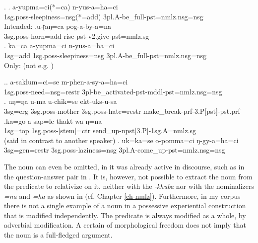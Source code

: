 \ex. \ag. a-yupma=ci(*=ca) n-yus-a=ha=ci\\
	{\sc 1sg.poss}-sleepiness{\sc =nsg(*=add)} {\sc 3pl.A}-be\_full{\sc -pst=nmlz.nsg=nsg}\\
	Intended:  
	\bg.u-ʈaŋ=ca pog-a-by-a=na\\
	{\sc 3sg.poss-}horn{\sc =add} rise{\sc [3sg]-pst-v2.give-pst=nmlz.sg}\\
	\bg. ka=ca a-yupma=ci n-yus-a=ha=ci \label{kacaayupma}\\
	{\sc 1sg=add} {\sc 1sg.poss}-sleepiness{\sc =nsg} {\sc 3pl.A}-be\_full{\sc -pst=nmlz.nsg=nsg}\\
	Only:   (not e.g. )
	

\ex.\ag. a-saklum=ci=se m-phen-a-sy-a=ha=ci\\
{\sc 1sg.poss}-need{\sc =nsg=restr} {\sc 3pl}-be\_activated-{\sc pst-mddl-pst=nmlz.nsg=nsg}	\\
\bg. uŋ=ŋa   u-ma             u-chik=se  ekt-uks-u-sa\\
{\sc 3sg=erg} {\sc 3sg.poss-}mother {\sc 3sg.poss-}hate{\sc =restr} make\_break{\sc -prf-3.P[pst]-pst.prf}\\
\bg.ka=go a-sap=le thakt-wa-ŋ=na\\
{\sc 1sg=top} {\sc 1sg.poss-}[stem]{\sc =ctr} send\_up{\sc -npst[3.P]-1sg.A=nmlz.sg}\\
 (said in contrast to another speaker)
\bg.  uk=ka=se  o-pomma=ci ŋ-gy-a=ha=ci\label{ukkaseopomma}\\
{\sc 3sg=gen=restr} {\sc 3sg.poss-}laziness{\sc =nsg} {\sc 3pl.A}-come\_up{\sc -pst=nmlz.nsg=nsg}\\


The noun can even be omitted, in  it was already active in discourse, such as in the question-answer pair in \Next. It is, however, not possible to extract the noun from the predicate to relativize on it, neither with the  \emph{-khuba} nor with the  nominalizers \emph{=na} and \emph{=ha} as shown in \NNext (cf. Chapter \ref{ch-nmlz}).  Furthermore, in my corpus there is not a single example of a noun in a possessive experiential construction that is modified independently. The predicate is always modified as a whole, by adverbial modification. A certain  of  morphological freedom does not imply that the noun is a full-fledged argument.


